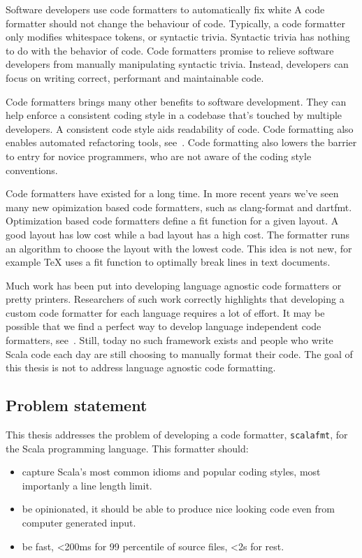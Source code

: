 \documentclass[11pt,a4paper]{article}
\begin{document}
Software developers use code formatters to automatically fix white
A code formatter should not change the behaviour of code.
Typically, a code formatter only modifies whitespace tokens, or syntactic trivia.
Syntactic trivia has nothing to do with the behavior of code.
Code formatters promise to relieve software developers from manually manipulating
syntactic trivia.
Instead, developers can focus on writing correct, performant and maintainable code.

Code formatters brings many other benefits to software development.
They can help enforce a consistent coding style in a codebase that's touched by multiple developers.
A consistent code style aids readability of code.
Code formatting also enables automated refactoring tools, see~\autocite{wright_large-scale_2013}.
Code formatting also lowers the barrier to entry for novice programmers, who are not aware of the coding style conventions.

Code formatters have existed for a long time.
In more recent years we've seen many new opimization based code formatters, such as clang-format and dartfmt.
Optimization based code formatters define a fit function for a given layout.
A good layout has low cost while a bad layout has a high cost.
The formatter runs an algorithm to choose the layout with the lowest code.
This idea is not new, for example TeX uses a fit function to optimally break lines
in text documents.

Much work has been put into developing language agnostic code formatters or pretty printers.
Researchers of such work correctly highlights that developing a custom code formatter for each language requires a lot of effort.
It may be possible that we find a perfect way to develop language independent code formatters, see~\autocite{mps_article}.
Still, today no such framework exists and people who write Scala code each day are still choosing to manually format their code.
The goal of this thesis is not to address language agnostic code formatting.

\subsection{Problem statement}
This thesis addresses the problem of developing a code formatter, \texttt{scalafmt}, for the Scala programming language.
This formatter should:
\begin{itemize}
  \item capture Scala's most common idioms and popular coding styles, most importanly a line length limit.
  \item be opinionated, it should be able to produce nice looking code even from computer generated input.
  \item be fast, <200ms for 99 percentile of source files, <2s for rest.
\end{itemize}
\end{document}
